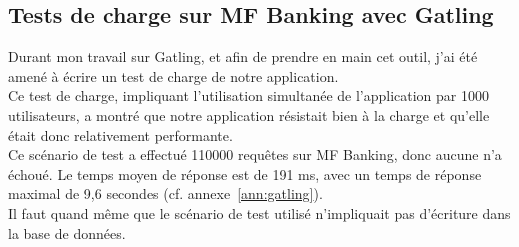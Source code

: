\subsection*{Tests de charge sur MF Banking avec Gatling}

Durant mon travail sur Gatling, et afin de prendre en main cet outil, j'ai été amené à écrire un test de charge de notre application.\\
Ce test de charge, impliquant l'utilisation simultanée de l'application par 1000 utilisateurs, a montré que notre application résistait bien à la charge et qu'elle était donc relativement performante.\\
Ce scénario de test a effectué 110000 requêtes sur MF Banking, donc aucune n'a échoué. Le temps moyen de réponse est de 191 ms, avec un temps de réponse maximal de 9,6 secondes (cf. annexe~\ref{ann:gatling}).\\
Il faut quand même que le scénario de test utilisé n'impliquait pas d'écriture dans la base de données.\\